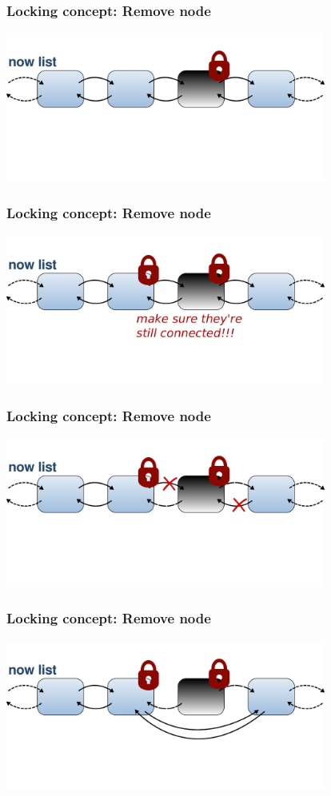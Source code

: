 \documentclass{beamer}
\begin{document}
\begin{frame}
\frametitle{Locking concept: Remove node}
\begin{center}
	\includegraphics[height=140pt]{remove2.pdf}
\end{center}
\end{frame}

\begin{frame}
\frametitle{Locking concept: Remove node}
\begin{center}
	\includegraphics[height=140pt]{remove3.pdf}
\end{center}
\end{frame}

\begin{frame}
\frametitle{Locking concept: Remove node}
\begin{center}
	\includegraphics[height=140pt]{remove4.pdf}
\end{center}
\end{frame}

\begin{frame}
\frametitle{Locking concept: Remove node}
\begin{center}
	\includegraphics[height=140pt]{remove5.pdf}
\end{center}
\end{frame}
\end{document}
